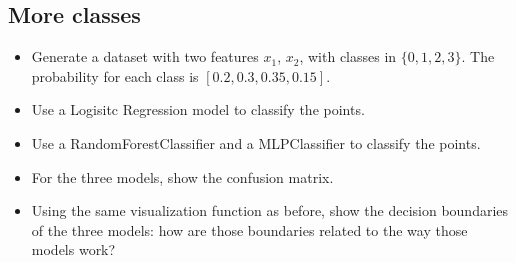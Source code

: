 \documentclass[letterpaper,10pt,english]{jupyterBook}
\begin{document}
\subsection{More classes}
\label{\detokenize{06:more-classes}}\begin{itemize}
\item {} 
\sphinxAtStartPar
Generate a dataset with two features \(x_1\), \(x_2\), with classes in \(\{0, 1, 2, 3\}\). The probability for each class is \([0.2, 0.3, 0.35, 0.15]\).

\item {} 
\sphinxAtStartPar
Use a Logisitc Regression model to classify the points.

\item {} 
\sphinxAtStartPar
Use a RandomForestClassifier and a MLPClassifier to classify the points.

\item {} 
\sphinxAtStartPar
For the three models, show the confusion matrix.

\item {} 
\sphinxAtStartPar
Using the same visualization function as before, show the decision boundaries of the three models: how are those boundaries related to the way those models work?

\end{itemize}
\end{document}
